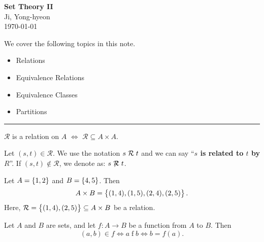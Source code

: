\documentclass[11pt,openany]{article}
\begin{document}
\begin{center}
	\huge\textbf{Set Theory II}\\
	\vspace{0.5em}
	\large{Ji, Yong-hyeon}\\
	\vspace{0.5em}
	\normalsize{\today}\\
\end{center}

\noindent We cover the following topics in this note.
\begin{itemize}
	\item Relations
	\item Equivalence Relations
	\item Equivalence Classes
	\item Partitions
\end{itemize}
\hrule\vspace{12pt}
\begin{remark*}
	$\mathcal{R}$ is a relation on $A$ $\iff$ $\mathcal{R}\subseteq A\times A$.
\end{remark*}
\begin{note}[Notation]
	Let $(s,t)\in\mathcal{R}$. We use the notation $s\mathrel{\mathcal{R}} t$ and we can say ``\textbf{$s$ is related to $t$ by $R$}''. If $(s,t)\notin\mathcal{R}$, we denote as: $s\centernot\relation t$.
\end{note}
\vfill
\begin{example*}
	Let $A=\set{1,2}$ and $B=\set{4,5}$. Then \[
	A\times B=\set{(1,4),(1,5),(2,4),(2,5)}.
	\] Here, $\mathcal{R}=\set{(1,4),(2,5)}\subseteq A\times B$ be a relation.
	\begin{center}
	
	\end{center}
\end{example*}

\begin{example*}
	Let $A$ and $B$ are sets, and let $f:A\to B$ be a function from $A$ to $B$. Then \[
	(a,b)\in f\iff a\mathrel{f}b\iff b=f(a).
	\]
\end{example*}
\end{document}
